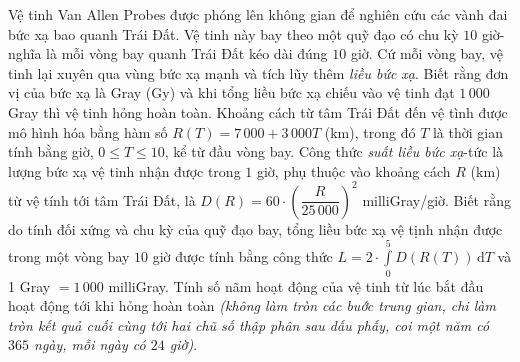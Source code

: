 \begin{ex}%
Vệ tinh Van Allen Probes được phóng lên không gian để nghiên cứu các vành đai bức xạ bao quanh Trái Đất. Vệ tinh này bay theo một quỹ đạo có chu kỳ $10$ giờ-nghĩa là mỗi vòng bay quanh Trái Đất kéo dài đúng $10$ giờ. Cứ mỗi vòng bay, vệ tinh lại xuyên qua vùng bức xạ mạnh và tích lũy thêm\textit{ liều bức xạ}. Biết rằng đơn vị của bức xạ là Gray (Gy) và khi tổng liều bức xạ chiếu vào vệ tinh đạt $1\,000$ Gray thì vệ tinh hỏng hoàn toàn. Khoảng cách từ tâm Trái Đất đến vệ tình được mô hình hóa bằng hàm số $R(T)=7\,000+3\,000T$ (km), trong đó $T$ là thời gian tính bằng giờ, $0\leq T\leq 10$, kể từ đầu vòng bay. Công thức \textit{suất liều bức xạ}-tức là lượng bức xạ vệ tinh nhận được trong $1$ giờ, phụ thuộc vào khoảng cách $R$ (km) từ vệ tính tới tâm Trái Đất, là $D(R)=60\cdot\left(\dfrac{R}{25\,000}\right)^2$ milliGray/giờ. Biết rằng do tính đối xứng và chu kỳ của quỹ đạo bay, tổng liều bức xạ vệ tịnh nhận được trong một vòng bay $10$ giờ được tính bằng công thức $L=2\cdot \displaystyle\int\limits_0^5 D(R(T)) \mathrm{\,d}T$ và 1 Gray $=1\,000$ milliGray. Tính số nãm hoạt động của vệ tinh từ lúc bắt đầu hoạt động tới khi hỏng hoàn toàn \textit{(không làm tròn các buớc trung gian, chi làm tròn kết quả cuối cùng tới hai chũ số thập phân sau dấu phấy, coi một năm có $365$ ngày, mỗi ngày có $24$ giờ)}.
\end{ex}
